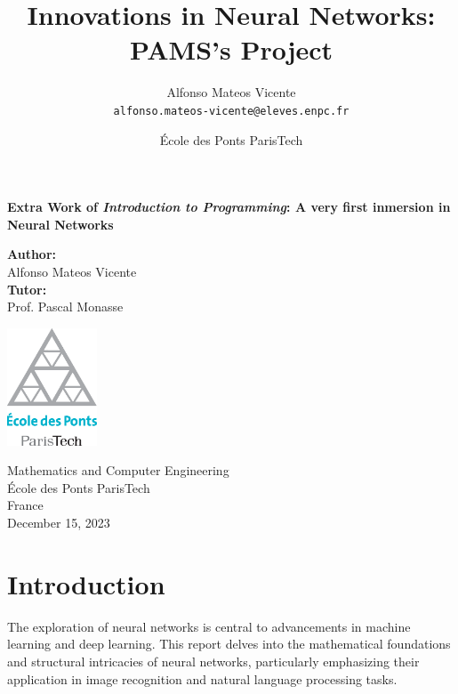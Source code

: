 \documentclass{article}
\title{Innovations in Neural Networks: PAMS's Project} %
\author{Alfonso Mateos Vicente\\ \texttt{alfonso.mateos-vicente@eleves.enpc.fr}} %
\date{École des Ponts ParisTech} %
\begin{document}
\begin{titlepage}
    \begin{center}
        \vspace*{1cm}
        
        \Huge
        \textbf{Extra Work of \textit{Introduction to Programming}: A very first inmersion in Neural Networks}
        
        \vspace{1.5cm}

        \Large
        \textbf{Author:} \\
        \vspace{0.25cm}
        \LARGE
        Alfonso Mateos Vicente \\
        \vspace{0.5cm}
        \Large
        \textbf{Tutor:} \\
        \vspace{0.25cm}
        \LARGE
        Prof. Pascal Monasse

        \vfill
        
        \includegraphics[width=0.2\textwidth]{./logo-enpc.eps}
        
        \vspace{1cm}
        
        \normalsize
        Mathematics and Computer Engineering \\
        École des Ponts ParisTech \\
        France \\
        December 15, 2023
    \end{center}
    \restoregeometry
\end{titlepage}


\newpage
\tableofcontents
\newpage


\section{Introduction}

The exploration of neural networks is central to advancements in machine learning and deep learning. This report delves into the mathematical foundations and structural intricacies of neural networks, particularly emphasizing their application in image recognition and natural language processing tasks.
\end{document}
